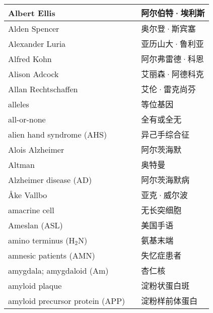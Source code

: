 \begin{longtable}{lll}
	\midrule
	Albert Ellis     &&  阿尔伯特·埃利斯  \\
	
	\midrule
	Alden Spencer     &&  奥尔登·斯宾塞  \\
	
	\midrule
	Alexander Luria     &&  亚历山大·鲁利亚  \\
	
	\midrule
	Alfred Kohn     &&  阿尔弗雷德·科恩  \\
	
	\midrule
	Alison Adcock     &&  艾丽森·阿德科克  \\
	
	\midrule
	Allan Rechtschaffen     &&  艾伦·雷克尚芬  \\
	
	\midrule
	alleles     &&  等位基因  \\
	
	\midrule
	all-or-none     &&  全有或全无  \\
	
	\midrule
	alien hand syndrome (AHS)     &&  异己手综合征  \\
	
	\midrule
	Alois Alzheimer     &&  阿尔茨海默  \\
	
	\midrule
	Altman     &&  奥特曼  \\
	
	\midrule
	Alzheimer disease (AD)     &&  阿尔茨海默病  \\
	
	\midrule
	Åke Vallbo     &&  亚克·威尔波  \\
	
	\midrule
	amacrine cell     && 无长突细胞   \\
	
	\midrule
	Ameslan (ASL)    && 美国手语   \\
	
	\midrule
	amino terminus (H$_2$N)   && 氨基末端   \\
	
	\midrule
	amnesic patients (AMN)    && 失忆症患者   \\
	
	\midrule
	amygdala; amygdaloid (Am)    && 杏仁核   \\
	
	\midrule
	amyloid plaque     && 淀粉状蛋白斑   \\
	
	\midrule
	amyloid precursor protein (APP)     && 淀粉样前体蛋白   \\
	

\end{longtable}
